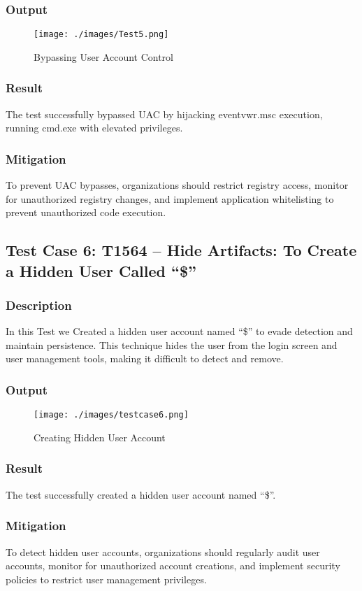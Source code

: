 \documentclass[11pt]{article}
\begin{document}
\subsubsection{Output}
\begin{figure}[H]
    \centering
    \texttt{[image: ./images/Test5.png]}
    \caption{Bypassing User Account Control}
\end{figure}
\subsubsection{Result}
The test successfully bypassed UAC by hijacking eventvwr.msc execution, running cmd.exe with elevated privileges.
\subsubsection{Mitigation}
To prevent UAC bypasses, organizations should restrict registry access, monitor for unauthorized registry changes, and implement application whitelisting to prevent unauthorized code execution.    
\subsection{Test Case 6: T1564 -- Hide Artifacts: To Create a Hidden User Called ``\$''}
\subsubsection{Description}
In this Test we Created a hidden user account named ``\$'' to evade detection and maintain persistence. This technique hides the user from the login screen and user management tools, making it difficult to detect and remove.
\subsubsection{Output}
\begin{figure}[H]
    \centering
    \texttt{[image: ./images/testcase6.png]}
    \caption{Creating Hidden User Account}
\end{figure}
\subsubsection{Result}
The test successfully created a hidden user account named ``\$''.
\subsubsection{Mitigation}
To detect hidden user accounts, organizations should regularly audit user accounts, monitor for unauthorized account creations, and implement security policies to restrict user management privileges.
\end{document}
